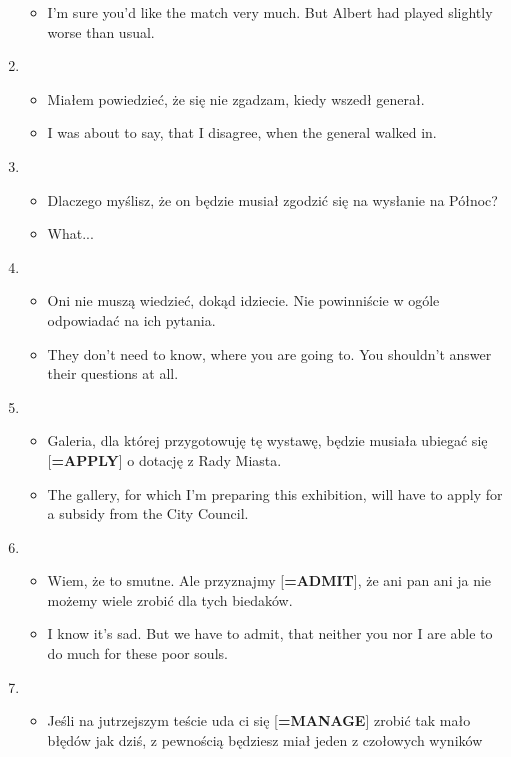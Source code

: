 \documentclass[a4paper]{article}
\begin{document}
\begin{enumerate}
\begin{itemize}
        \item I'm sure you'd like the match very much. But Albert had played slightly worse than usual.
    \end{itemize}
    \item \begin{itemize}
        \item Miałem powiedzieć, że się nie zgadzam, kiedy wszedł generał.
        \item I was about to say, that I disagree, when the general walked in.
    \end{itemize}
    \item \begin{itemize}
        \item Dlaczego myślisz, że on będzie musiał zgodzić się na wysłanie na Północ?
        \item What...
    \end{itemize}
    \item \begin{itemize}
        \item Oni nie muszą wiedzieć, dokąd idziecie. Nie powinniście w ogóle odpowiadać na ich pytania.
        \item They don't need to know, where you are going to. You shouldn't answer their questions at all.
    \end{itemize}
    \item \begin{itemize}
        \item Galeria, dla której przygotowuję tę wystawę, będzie musiała ubiegać się [{\bf=APPLY}] o dotację z Rady Miasta.
        \item The gallery, for which I'm preparing this exhibition, will have to apply for a subsidy from the City Council.
    \end{itemize}
    \item \begin{itemize}
        \item Wiem, że to smutne. Ale przyznajmy [{\bf=ADMIT}], że ani pan ani ja nie możemy wiele zrobić dla tych biedaków.
        \item I know it's sad. But we have to admit, that neither you nor I are able to do much for these poor souls.
    \end{itemize}
    \item \begin{itemize}
        \item Jeśli na jutrzejszym teście uda ci się [{\bf=MANAGE}] zrobić tak mało błędów jak dziś, z pewnością będziesz miał jeden z czołowych wyników

\end{itemize}
\end{enumerate}
\end{document}
